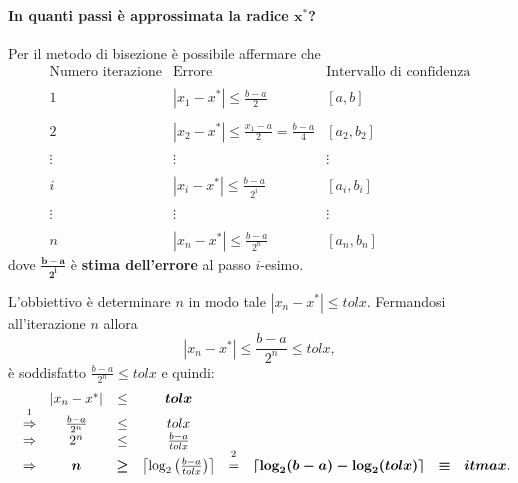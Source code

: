 \paragraph{In quanti passi è approssimata la radice $\boldsymbol{x^*}$?}
Per il metodo di bisezione è possibile affermare che
\begin{equation*}
	\begin{matrix}
		\text{Numero iterazione} & \text{Errore} & \text{Intervallo di confidenza}\\\\
		1 & |x_1-x^*| \leq \frac{b-a}{2} & [a,b] \\\\
		2 & |x_2-x^*|\leq \frac{x_1-a}{2}=\frac{b-a}{4}  & [a_2,b_2]\\\\
		\vdots & \vdots & \vdots \\\\
		i & |x_i-x^*|\leq\frac{b-a}{2^i} & [a_i,b_i]\\\\
		\vdots & \vdots & \vdots \\\\
		n & |x_n-x^*|\leq\frac{b-a}{2^n} & [a_n,b_n]
	\end{matrix}
\end{equation*}
dove $\boldsymbol{\frac{b-a}{2^i}}$ è \textbf{stima dell'errore} al passo $i$-esimo.

L'obbiettivo è determinare $n$ in modo tale $|x_n-x^*|\leq tolx$. Fermandosi all'iterazione $n$ allora 
\begin{equation*}
	|x_n-x^*|\leq\frac{b-a}{2^n}\leq tolx,
\end{equation*}
è soddisfatto $\frac{b-a}{2^n}\leq tolx$ e quindi:
\begin{equation*}
	\begin{matrix}
		&& |x_n-x^*| &\leq& \boldsymbol{tolx}\\
		&\overset{\footnotemark}{\Rightarrow}&\frac{b-a}{2^n}&\leq& tolx \\
		&\Rightarrow& 2^n&\leq&\frac{b-a}{tolx}\\
		&\Rightarrow& \boldsymbol n &\boldsymbol\geq&\left\lceil \log_{2}\left(\frac{b-a}{tolx}\right)\right\rceil&\overset{\footnotemark}{=}&\boldsymbol{\lceil \log_{2}(b-a)-\log_{2}(tolx)\rceil}&\boldsymbol\equiv& \boldsymbol{itmax}.
	\end{matrix}
\end{equation*}

\addtocounter{footnote}{-1}

